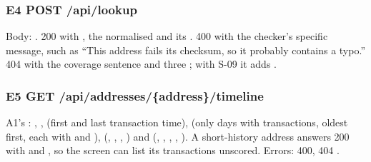 \subsubsection*{E4 \quad POST /api/lookup}
Body: . 200 with , the normalised  and its
. 400  with the checker's specific message, such as ``This address fails
its checksum, so it probably contains a typo.'' 404  with the coverage sentence
and three ; with S-09 it adds .

\subsubsection*{E5 \quad GET /api/addresses/\{address\}/timeline}
A1's : , ,  (first and last
transaction time),  (only days with transactions, oldest first, each with
 and ),  (, ,
, ) and  (, ,
, , ). A short-history address answers 200 with
 and , so the screen can list its
transactions unscored. Errors: 400, 404 .

